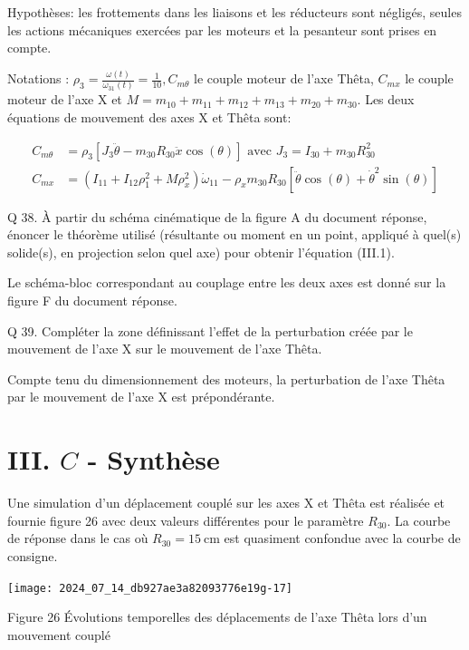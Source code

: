 \documentclass[10pt]{article}
\begin{document}
Hypothèses: les frottements dans les liaisons et les réducteurs sont négligés, seules les actions mécaniques exercées par les moteurs et la pesanteur sont prises en compte.

Notations : $\rho_{3}=\frac{\omega(t)}{\omega_{31}(t)}=\frac{1}{10}, C_{m \theta}$ le couple moteur de l'axe Thêta, $C_{m x}$ le couple moteur de l'axe X et $M=m_{10}+m_{11}+m_{12}+m_{13}+m_{20}+m_{30}$. Les deux équations de mouvement des axes X et Thêta sont:


\begin{align*}
C_{m \theta} & =\rho_{3}\left[J_{3} \ddot{\theta}-m_{30} R_{30} \ddot{x} \cos (\theta)\right] \text { avec } J_{3}=I_{30}+m_{30} R_{30}^{2}  \tag{III.1}\\
C_{m x} & =\left(I_{11}+I_{12} \rho_{1}^{2}+M \rho_{x}^{2}\right) \dot{\omega}_{11}-\rho_{x} m_{30} R_{30}\left[\ddot{\theta} \cos (\theta)+\dot{\theta}^{2} \sin (\theta)\right] \tag{III.2}
\end{align*}


Q 38. À partir du schéma cinématique de la figure A du document réponse, énoncer le théorème utilisé (résultante ou moment en un point, appliqué à quel(s) solide(s), en projection selon quel axe) pour obtenir l'équation (III.1).

Le schéma-bloc correspondant au couplage entre les deux axes est donné sur la figure F du document réponse.

Q 39. Compléter la zone définissant l'effet de la perturbation créée par le mouvement de l'axe X sur le mouvement de l'axe Thêta.

Compte tenu du dimensionnement des moteurs, la perturbation de l'axe Thêta par le mouvement de l'axe X est prépondérante.

\section*{III. $C$ - Synthèse}
Une simulation d'un déplacement couplé sur les axes X et Thêta est réalisée et fournie figure 26 avec deux valeurs différentes pour le paramètre $R_{30}$. La courbe de réponse dans le cas où $R_{30}=15 \mathrm{~cm}$ est quasiment confondue avec la courbe de consigne.

\begin{center}
\texttt{[image: 2024\_07\_14\_db927ae3a82093776e19g-17]}
\end{center}

Figure 26 Évolutions temporelles des déplacements de l'axe Thêta lors d'un mouvement couplé
\end{document}
